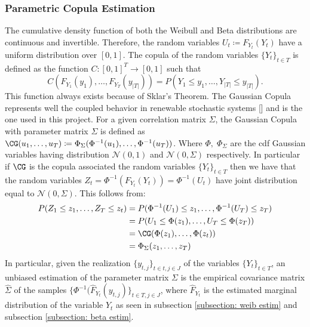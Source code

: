 \documentclass[english]{article}
\numberwithin{definition}{section}
\numberwithin{theorem}{section}
\numberwithin{problem}{section}
\begin{document}
\subsubsection{Parametric Copula Estimation}
The cumulative density function of both the Weibull and Beta distributions are continuous and invertible. Therefore, the random variables \( U_t \coloneqq F_{Y_t}(Y_t) \) have a uniform distribution over \([0,1]\). The copula of the random variables \(\{Y_t\}_{t \in T}\) is defined as the function \(C: [0,1]^T \to [0,1]\) such that 
\begin{equation}
C(F_{Y_1}(y_1), \ldots, F_{Y_T}(y_{|T|})) = P(Y_1 \leq y_1, \ldots, Y_{|T|} \leq y_{|T|}).
\end{equation}
This function always exists because of Sklar's Theorem. The Gaussian Copula represents well the coupled behavior in renewable stochastic systems [\cite{GaussCoupula}] and is the one used in this project.
 For a given correlation matrix \(\Sigma\), the Gaussian Copula with parameter matrix \(\Sigma\) is defined as \(\CG(u_1,\ldots,u_{T}) \coloneqq \Phi_{\Sigma}(\Phi^{-1}(u_1),\ldots, \Phi^{-1}(u_T))\).
  Where \(\Phi,\; \Phi_{\Sigma}\) are the cdf Gaussian variables having distribution \(\mathcal{N}(0,1)\) and \( \mathcal{N}(0,\Sigma)\) respectively. In particular if \(\CG\) is the copula associated the random variables \(\{Y_t\}_{t \in T}\) then we have that the random variables \(Z_t = \Phi^{-1}(F_{Y_t}(Y_t)) = \Phi^{-1}(U_t)\) have joint distribution equal to \(\mathcal{N}(0, \Sigma)\). This follows from: \\
\begin{align*}
P(Z_1 \leq z_1, \ldots, Z_T \leq z_t) &= P(\Phi^{-1}(U_1) \leq z_1, \ldots, \Phi^{-1}(U_T) \leq z_T) \\
&= P(U_1 \leq \Phi(z_1), \ldots, U_T \leq \Phi(z_T)) \\
&= \CG(\Phi(z_1), \ldots, \Phi(z_t)) \\
&= \Phi_{\Sigma}(z_1, \ldots, z_T)
\end{align*}
In particular, given the realization \(\{y_{t,j}\}_{t \in t, j \in J}\) of the variables \(\{Y_t\}_{t \in T}\), an unbiased estimation of the parameter matrix \(\Sigma\) is the empirical covariance matrix \(\hat \Sigma\) of the samples \(\{\Phi^{-1}(\hat{F}_{Y_t}(y_{t,j})\}_{t\in T, j \in J}\), where \(\hat{F}_{Y_t}\) is the estimated marginal distribution of the variable \(Y_t\) as seen in subsection \ref{subsection: weib estim} and subsection \ref{subsection: beta estim}.\\
\end{document}
